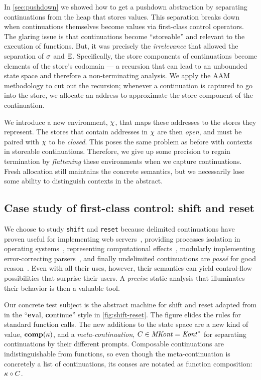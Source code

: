 In \autoref{sec:pushdown} we showed how to get a pushdown abstraction by separating continuations from the heap that stores values.
%
This separation breaks down when continuations themselves become values via first-class control operators.
%
The glaring issue is that continuations become ``storeable'' and relevant to the execution of functions.
%
But, it was precisely the \emph{irrelevance} that allowed the separation of $\sigma$ and $\Xi$.
%
Specifically, the store components of continuations become elements of the store's codomain --- a recursion that can lead to an unbounded state space and therefore a non-terminating analysis.
%
We apply the AAM methodology to cut out the recursion; whenever a continuation is captured to go into the store, we allocate an address to approximate the store component of the continuation.

We introduce a new environment, $\chi$, that maps these addresses to the stores they represent.
%
The stores that contain addresses in $\chi$ are then \emph{open}, and must be paired with $\chi$ to be \emph{closed}.
%
This poses the same problem as before with contexts in storeable continuations.
%
Therefore, we give up some precision to regain termination by \emph{flattening} these environments when we capture continuations.
%
Fresh allocation still maintains the concrete semantics, but we necessarily lose some ability to distinguish contexts in the abstract.

\subsection{Case study of first-class control: shift and reset}
We choose to study {\tt shift} and {\tt reset} because delimited continuations have proven useful for implementing web servers~\citep{plt-webserver}, providing processes isolation in operating systems~\citep{ianjohnson:Kiselyov2007Delimited}, representing computational effects~\citep{ianjohnson:Filinski1994Representing}, modularly implementing error-correcting parsers~\citep{ianjohnson:DBLP:conf/icfp/ShiversT11}, and finally undelimited continuations are \emph{pass\'e} for good reason~\citep{ianjohnson:kiselyov:against-callcc}.
%
Even with all their uses, however, their semantics can yield control-flow possibilities that surprise their users.
%
A \emph{precise} static analysis that illuminates their behavior is then a valuable tool.
%

Our concrete test subject is the abstract machine for shift and reset adapted from \citet{ianjohnson:Biernacki2006274} in the ``{\bf ev}al, {\bf co}ntinue'' style in \autoref{fig:shift-reset}.
%
The figure elides the rules for standard function calls.
%
The new additions to the state space are a new kind of value, $\mathbf{comp}(\kappa)$, and a \emph{meta-continuation}, $C \in \mathit{MKont} = \mathit{Kont}^*$ for separating continuations by their different prompts.
%
Composable continuations are indistinguishable from functions, so even though the meta-continuation is concretely a list of continuations, its conses are notated as function composition: $\kappa\circ C$.

